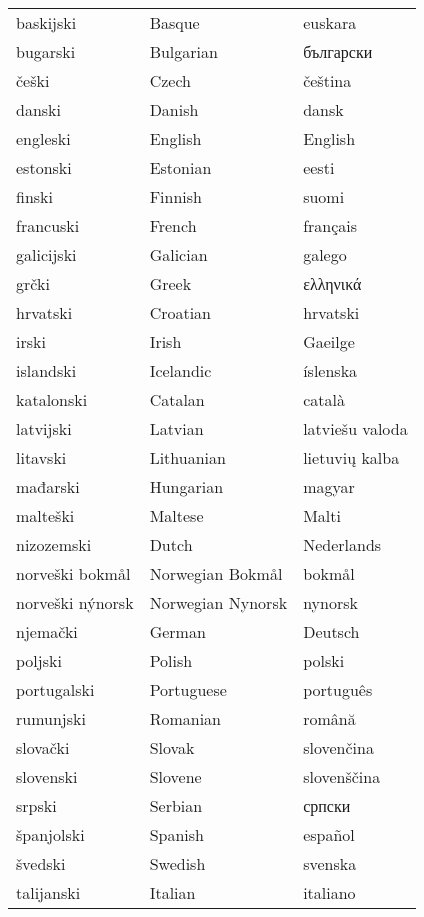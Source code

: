 \vspace*{-5mm}
\centering
  \setlength{\tabcolsep}{2em}
  \begin{tabulary}{170mm}{LLL} \toprule
    baskijski & Basque & euskara \\
  bugarski & Bulgarian & български \\
  češki & Czech & čeština \\
  danski & Danish & dansk \\
  engleski & English & English \\
  estonski & Estonian & eesti \\
  finski & Finnish & suomi \\
  francuski & French & français \\
  galicijski & Galician & galego \\
  grčki & Greek & ελληνικά \\
  hrvatski & Croatian & hrvatski \\
  irski & Irish & Gaeilge \\
  islandski & Icelandic & íslenska \\
  katalonski & Catalan & català \\
  latvijski & Latvian & latviešu valoda \\
  litavski & Lithuanian & lietuvių kalba \\
  mađarski & Hungarian & magyar \\
  malteški & Maltese & Malti \\
  nizozemski & Dutch & Nederlands \\
  norveški bokmål & Norwegian Bokmål & bokmål \\
  norveški nýnorsk & Norwegian Nynorsk & nynorsk \\
  njemački & German & Deutsch \\  
  poljski & Polish & polski \\
  portugalski & Portuguese & português \\
  rumunjski & Romanian & română \\
  slovački & Slovak & slovenčina \\
  slovenski & Slovene & slovenščina \\
  srpski & Serbian & српски \\
  španjolski & Spanish & español \\
  švedski & Swedish & svenska \\
  talijanski & Italian & italiano \\ \bottomrule
\end{tabulary}


